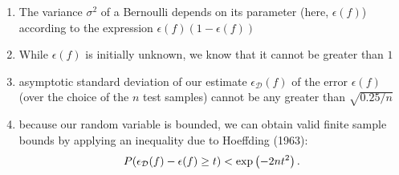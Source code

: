 \begin{enumerate}[itemsep=0.2cm]
    \item The variance $\sigma^2$ of a Bernoulli depends on its parameter (here, $\epsilon(f)$) according to the expression $\epsilon(f)(1-\epsilon(f))$

    \item While $\epsilon(f)$ is initially unknown, we know that it cannot be greater than $1$

    \item asymptotic standard deviation of our estimate $\epsilon_\mathcal{D}(f)$ of the error $\epsilon(f)$ (over the choice of the $n$ test samples) cannot be any greater than $\sqrt{0.25/n}$

    \item because our random variable is bounded, we can obtain valid finite sample bounds by applying an inequality due to Hoeffding (1963):
    \[
        \hfill
        P(\epsilon_\mathcal{D}(f) - \epsilon(f) \geq t) < \exp\left( - 2n t^2 \right).
        \hfill
    \]

\end{enumerate}




\vspace{0.5cm}

